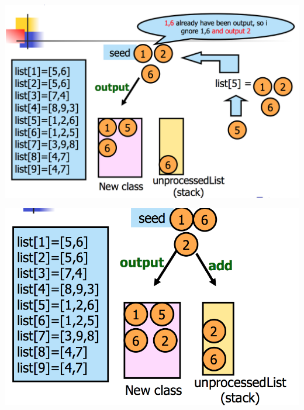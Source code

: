 \documentclass[a4paper,11pt,twoside]{book}
\begin{document}
\begin{minipage}{.5\textwidth}	
	\includegraphics[scale=0.35]{pics/offline_5.png} 
\end{minipage}
\begin{minipage}{.5\textwidth}	
	\includegraphics[scale=0.35]{pics/offline_6.png}  
\end{minipage}
\end{document}
